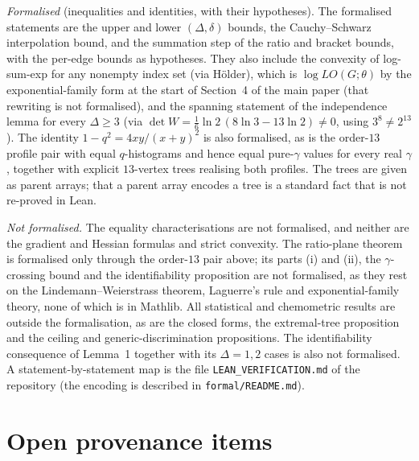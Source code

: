 \documentclass[a5paper, 10pt]{article}
\theoremstyle{plain}
\theoremstyle{remark}
\theoremstyle{definition}
\begin{document}
\emph{Formalised} (inequalities and identities, with their hypotheses).
The formalised statements are the upper and lower $(\Delta,\delta)$
bounds, the Cauchy--Schwarz interpolation bound, and the summation step
of the ratio and bracket bounds, with the per-edge bounds as
hypotheses. They also include the convexity of log-sum-exp for any
nonempty index set (via H\"older), which is $\log LO(G;\theta)$ by
the exponential-family form at the start of Section~4 of the main paper (that rewriting is not formalised), and the
spanning statement of the independence lemma for
every $\Delta \ge 3$ (via $\det W = \tfrac16\ln 2\,(8\ln 3 - 13\ln 2)
\neq 0$, using $3^8 \neq 2^{13}$). The identity
$1 - q^2 = 4xy/(x+y)^2$ is also formalised, as is the order-$13$ profile
pair with equal $q$-histograms and hence equal pure-$\gamma$ values
for every real $\gamma$, together with explicit $13$-vertex trees
realising both profiles. The trees are given as parent arrays; that a
parent array encodes a tree is a standard fact that is not re-proved
in Lean.

\emph{Not formalised.} The equality characterisations are not
formalised, and neither are the gradient and Hessian formulas and strict
convexity. The ratio-plane theorem is formalised only through the
order-$13$ pair above; its parts (i) and (ii), the $\gamma$-crossing bound and
the identifiability proposition are not formalised, as they rest on
the Lindemann--Weierstrass theorem, Laguerre's rule and
exponential-family theory, none of which is in Mathlib. All
statistical and chemometric results are outside the formalisation, as
are the closed forms, the extremal-tree proposition and the
ceiling and generic-discrimination propositions. The identifiability
consequence of Lemma~1 together with its $\Delta = 1, 2$ cases is
also not formalised. A statement-by-statement map is the file
\texttt{LEAN\_VERIFICATION.md} of the repository (the encoding is
described in \texttt{formal/README.md}).

\section{Open provenance items}\label{sec:s-quality}
\end{document}
